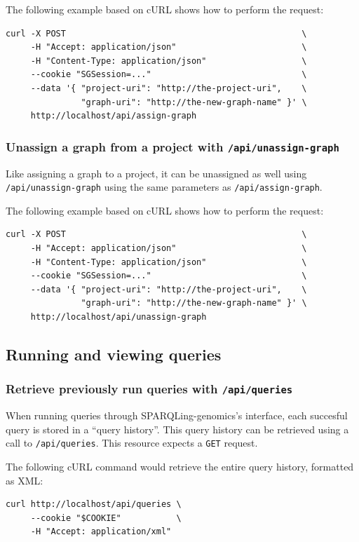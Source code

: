   The following example based on cURL shows how to perform the request:
\begin{siderules}
\begin{verbatim}
curl -X POST                                               \
     -H "Accept: application/json"                         \
     -H "Content-Type: application/json"                   \
     --cookie "SGSession=..."                              \
     --data '{ "project-uri": "http://the-project-uri",    \
               "graph-uri": "http://the-new-graph-name" }' \
     http://localhost/api/assign-graph
\end{verbatim}
\end{siderules}

\subsubsection{Unassign a graph from a project with \texttt{/api/unassign-graph}}

  Like assigning a graph to a project, it can be unassigned as well using
  \texttt{/api/unassign-graph} using the same parameters as
  \texttt{/api/assign-graph}.

  The following example based on cURL shows how to perform the request:
\begin{siderules}
\begin{verbatim}
curl -X POST                                               \
     -H "Accept: application/json"                         \
     -H "Content-Type: application/json"                   \
     --cookie "SGSession=..."                              \
     --data '{ "project-uri": "http://the-project-uri",    \
               "graph-uri": "http://the-new-graph-name" }' \
     http://localhost/api/unassign-graph
\end{verbatim}
\end{siderules}

\subsection{Running and viewing queries}

\subsubsection{Retrieve previously run queries with \texttt{/api/queries}}

  When running queries through SPARQLing-genomics's interface, each succesful
  query is stored in a ``query history''.  This query history can be retrieved
  using a call to \texttt{/api/queries}.  This resource expects a \texttt{GET}
  request.

  The following cURL command would retrieve the entire query history, formatted
  as XML:

\begin{siderules}
\begin{verbatim}
curl http://localhost/api/queries \
     --cookie "$COOKIE"           \
     -H "Accept: application/xml"
\end{verbatim}
\end{siderules}
